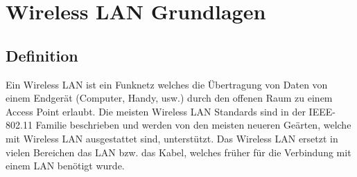 \chapter{Wireless LAN Grundlagen}
\label{sec:TheoretischeGrundlagen}

\section{Definition}
Ein Wireless LAN ist ein Funknetz welches die Übertragung von Daten von einem Endgerät (Computer, Handy, usw.) durch den offenen Raum zu einem Access Point erlaubt. Die meisten Wireless LAN Standards sind in der IEEE-802.11 Familie beschrieben und werden von den meisten neueren Geärten, welche mit Wireless LAN ausgestattet sind, unterstützt. Das Wireless LAN ersetzt in vielen Bereichen das LAN bzw. das Kabel, welches früher für die Verbindung mit einem LAN benötigt wurde.

